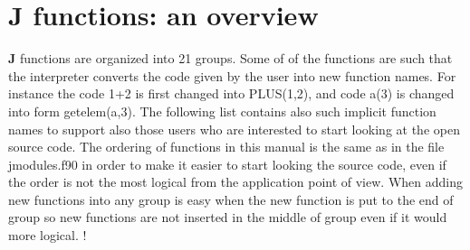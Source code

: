 \section{\textbf{J} functions: an overview}
\label{jfuncs}
\textbf{J} functions are organized into 21 groups. Some of of the functions are such that the
interpreter converts the code given by the user into new function names. For instance
the code 1+2 is first changed into \textcolor{VioletRed}{PLUS}(1,2), and code a(3) is changed
into form \textcolor{VioletRed}{getelem}(a,3). The following list contains also such implicit
function names to support also those users who are interested to start looking at
the open source code.
The ordering of functions in this manual is the same as in the file jmodules.f90
in order to make it easier to start looking the source code, even if the order is
not the most logical from the application point of view. When adding new functions into
any group is easy when the new function is put to the end of group so new functions are not inserted
in the middle of group even if it would more logical.
!
